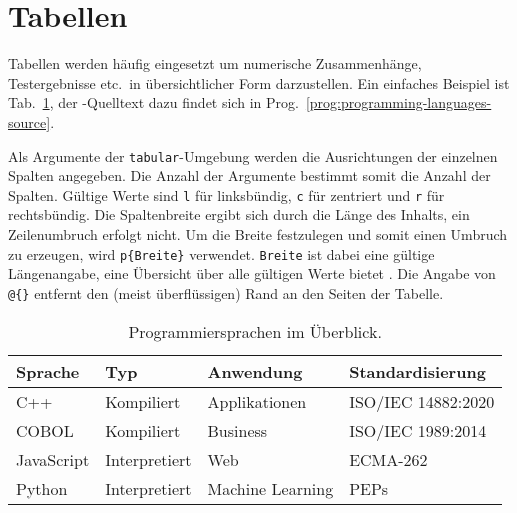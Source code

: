 \section{Tabellen}
\label{sec:tabellen}

Tabellen werden häufig eingesetzt um numerische Zusammenhänge, Testergebnisse
etc.\ in übersichtlicher Form darzustellen. Ein einfaches Beispiel ist
Tab.~\ref{tab:programming-languages}, der \latex-Quelltext dazu findet sich in
Prog.~\ref{prog:programming-languages-source}.

Als Argumente der \texttt{tabular}-Umgebung werden die Ausrichtungen der
einzelnen Spalten angegeben. Die Anzahl der Argumente bestimmt somit die
Anzahl der Spalten. Gültige Werte sind \texttt{l} für linksbündig, \texttt{c}
für zentriert und \texttt{r} für rechtsbündig. Die Spaltenbreite ergibt sich
durch die Länge des Inhalts, ein Zeilenumbruch erfolgt nicht. Um die Breite
festzulegen und somit einen Umbruch zu erzeugen, wird \verb|p{Breite}|
verwendet. \texttt{Breite} ist dabei eine gültige Längenangabe, eine
Übersicht über alle gültigen Werte bietet \cite{WikibooksLaTeXLengths2018}.
Die Angabe von \verb|@{}| entfernt den (meist überflüssigen) Rand an den
Seiten der Tabelle.

\begin{table}
	\caption{Programmiersprachen im Überblick.}
	\label{tab:programming-languages}
	\centering
	\setlength{\tabcolsep}{10pt} %
	\def\arraystretch{1.25}      %
	\begin{tabular}{@{}llll@{}}
		\toprule
		Sprache    & Typ           & Anwendung        & Standardisierung   \\
		\midrule
		C++        & Kompiliert    & Applikationen    & ISO/IEC 14882:2020 \\
		COBOL      & Kompiliert    & Business         & ISO/IEC 1989:2014  \\
		JavaScript & Interpretiert & Web              & ECMA-262           \\
		Python     & Interpretiert & Machine Learning & PEPs               \\
		\bottomrule
	\end{tabular}
\end{table}

